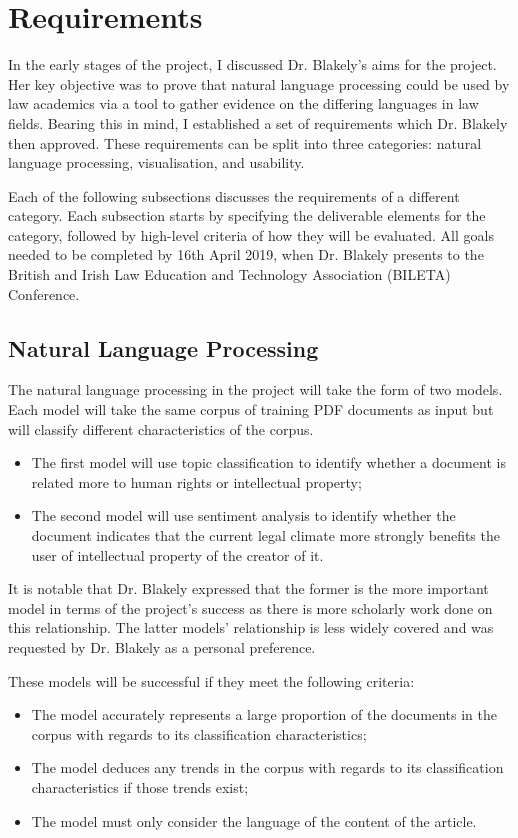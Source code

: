 	\section{Requirements}\label{sec:req}
		In the early stages of the project, I discussed Dr. Blakely's aims for the project. Her key objective was to prove that natural language processing could be used by law academics via a tool to gather evidence on the differing languages in law fields. Bearing this in mind, I established a set of requirements which Dr. Blakely then approved. These requirements can be split into three categories: natural language processing, visualisation, and usability.  

		Each of the following subsections discusses the requirements of a different category. Each subsection starts by specifying the deliverable elements for the category, followed by high-level criteria of how they will be evaluated. All goals needed to be completed by 16th April 2019, when Dr. Blakely presents to the British and Irish Law Education and Technology Association (BILETA) Conference. 
		\subsection{Natural Language Processing}
			The natural language processing in the project will take the form of two models. Each model will take the same corpus of training PDF documents as input but will classify different characteristics of the corpus.
			
			\begin{itemize}
				\item The first model will use topic classification to identify whether a document is related more to human rights or intellectual property;
				\item The second model will use sentiment analysis to identify whether the document indicates that the current legal climate more strongly benefits the user of intellectual property of the creator of it.
			\end{itemize}
			
			It is notable that Dr. Blakely expressed that the former is the more important model in terms of the project's success as there is more scholarly work done on this relationship. The latter models' relationship is less widely covered and was requested by Dr. Blakely as a personal preference. 

			These models will be successful if they meet the following criteria: 
			\begin{itemize}
				\item The model accurately represents a large proportion of the documents in the corpus with regards to its classification characteristics; 
				\item The model deduces any trends in the corpus with regards to its classification characteristics if those trends exist;
				\item The model must only consider the language of the content of the article. 
			\end{itemize}
			
